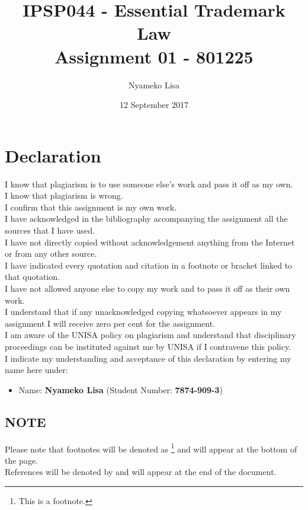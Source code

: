 \documentclass[11pt]{article}
\author{Nyameko Lisa}
\date{12 September 2017}
\title{IPSP044 - Essential Trademark Law\\\medskip
\large Assignment 01 - 801225}
\begin{document}
\maketitle
\addvspace{110pt}

\justifying
\addvspace{110pt}
\section*{Declaration}
\label{sec:org9488adf}
I know that plagiarism is to use someone else’s work and pass it off as my own.\\
I know that plagiarism is wrong.\\
I confirm that this assignment is my own work.\\
I have acknowledged in the bibliography accompanying the assignment all the sources that I have used.\\
I have not directly copied without acknowledgement anything from the Internet or from any other source.\\
I have indicated every quotation and citation in a footnote or bracket linked to that quotation.\\
I have not allowed anyone else to copy my work and to pass it off as their own work.\\
I understand that if any unacknowledged copying whatsoever appears in my assignment I will receive zero per cent for the assignment.\\
I am aware of the UNISA policy on plagiarism and understand that disciplinary proceedings can be instituted against me by UNISA if I contravene this policy.\\
I indicate my understanding and acceptance of this declaration by
entering my name here under:
\begin{itemize}
\item Name: \textbf{Nyameko Lisa} (Student Number: \textbf{7874-909-3})
\end{itemize}

\subsection*{NOTE}
\label{sec:org9f38096}
Please note that footnotes will be denoted as \footnote{This is a footnote.} and will
appear at the bottom of the page.\\
References will be denoted by \cite{rsa93_tm_act} and will appear at the end of the document.
\newpage
\end{document}
